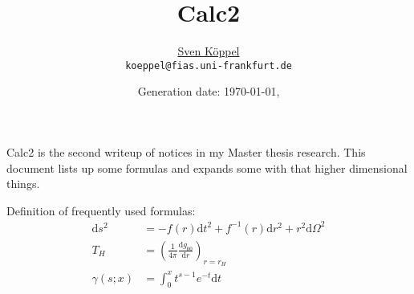\documentclass[10pt,a4paper, fleqn]{article}
\title{\vspace{-9ex} Calc2 \vspace{-1ex}} %
\author{\small %
\href{https://itp.uni-frankfurt.de/~koeppel}{Sven Köppel} \\
\small \texttt{koeppel@fias.uni-frankfurt.de}}
\date{\small Generation date: \today, \currenttime}
\begin{document}
\maketitle

\renewcommand{\d}{\mathrm{d}}
\newcommand{\dd}[2]{\frac{\mathrm{d} #1}{\mathrm{d} #2}}
\renewcommand{\L}{L_P}
\newcommand{\pr}{p_r}
\newcommand{\psenk}{p_\perp}
\newcommand{\ebenso}{\biggl( ~ \therefore ~ \biggr) }
\newcommand{\metrik}[1]{\d s^2 = \left( #1 \right) \d t^2 \left( #1 \right)^{-1} \d r^2 + r^2 \d \Omega^2 }
\newcommand{\winkel}{r^2 \d \Omega^2}
\newcommand{\dann}{$\rightarrow~$}

\begin{multicols}{2}
Calc2 is the second writeup of notices in my Master thesis
research. This document lists up some formulas and expands some
with that higher dimensional things. 

\vspace{1.3cm}
Definition of frequently used formulas:
%
\begin{align*}
\d s^2 &= -f(r) \d t^2 + f^{-1}(r) \d r^2 + r^2 \d \Omega^2 \\
T_H &= \left( \frac{1}{4 \pi} \dd{g_{00}}{r} \right)_{r=r_H} \\
\gamma(s;x) &= \int_0^x t^{s-1} e^{-t} \d t
\end{align*}
%
\columnbreak
\tableofcontents
\end{multicols}
\end{document}
